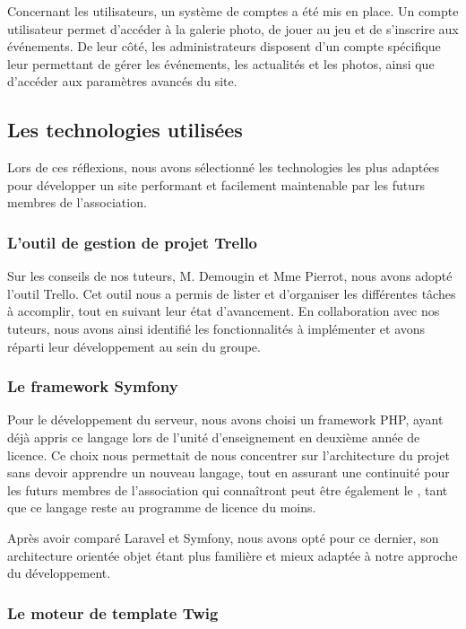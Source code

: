 Concernant les utilisateurs, un système de comptes a été mis en place. Un compte utilisateur permet d’accéder à la galerie photo, de jouer au jeu et de s’inscrire aux événements. De leur côté, les administrateurs disposent d’un compte spécifique leur permettant de gérer les événements, les actualités et les photos, ainsi que d’accéder aux paramètres avancés du site.

\subsection{Les technologies utilisées}

Lors de ces réflexions, nous avons sélectionné les technologies les plus adaptées pour développer un site performant et facilement maintenable par les futurs membres de l’association.

\subsubsection*{L'outil de gestion de projet Trello}

Sur les conseils de nos tuteurs, M. Demougin et Mme Pierrot, nous avons adopté l’outil Trello. Cet outil nous a permis de lister et d’organiser les différentes tâches à accomplir, tout en suivant leur état d'avancement. En collaboration avec nos tuteurs, nous avons ainsi identifié les fonctionnalités à implémenter et avons réparti leur développement au sein du groupe.

\subsubsection*{Le framework Symfony}

Pour le développement du serveur, nous avons choisi un framework PHP, ayant déjà appris ce langage lors de l’unité d’enseignement  en deuxième année de licence. Ce choix nous permettait de nous concentrer sur l’architecture du projet sans devoir apprendre un nouveau langage, tout en assurant une continuité pour les futurs membres de l’association qui connaîtront peut être également le , tant que ce langage reste au programme de licence du moins.

Après avoir comparé Laravel et Symfony, nous avons opté pour ce dernier, son architecture orientée objet étant plus familière et mieux adaptée à notre approche du développement.

\subsubsection*{Le moteur de template Twig}

